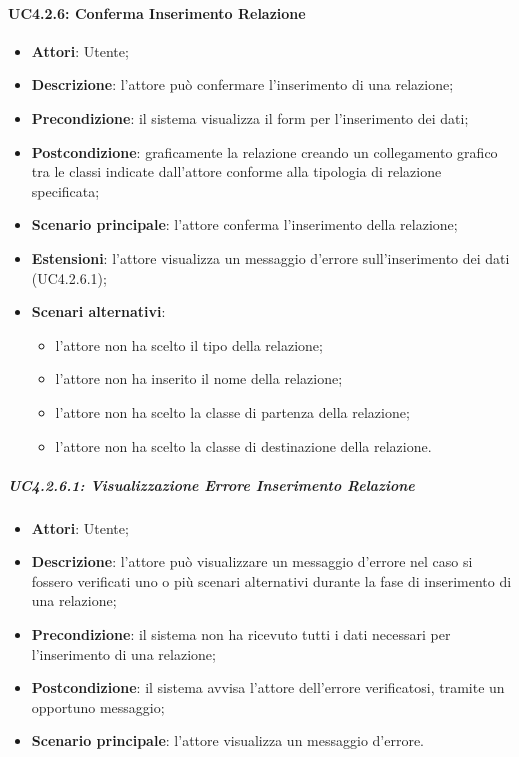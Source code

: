 \begin{itemize}
\begin{itemize}
\begin{itemize}
\begin{itemize}
\paragraph{UC4.2.6: Conferma Inserimento Relazione}
\label{UC4.2.6}
\begin{itemize}
	\item \textbf{Attori}: Utente;
	\item \textbf{Descrizione}: l'attore può confermare l'inserimento di una relazione;
	\item \textbf{Precondizione}: il sistema visualizza il form per l'inserimento dei dati;
	\item \textbf{Postcondizione}: graficamente la relazione creando un collegamento grafico tra le classi indicate dall'attore conforme alla tipologia di relazione specificata;
	\item \textbf{Scenario principale}: l'attore conferma l'inserimento della relazione;
	\item \textbf{Estensioni}: l'attore visualizza un messaggio d'errore sull'inserimento dei dati (UC4.2.6.1);
	\item \textbf{Scenari alternativi}:
	\begin{itemize}
		\item l'attore non ha scelto il tipo della relazione;
		\item l'attore non ha inserito il nome della relazione;
		\item l'attore non ha scelto la classe di partenza della relazione;
		\item l'attore non ha scelto la classe di destinazione della relazione.
	\end{itemize}
\end{itemize}

\subparagraph{UC4.2.6.1: Visualizzazione Errore Inserimento Relazione}
\label{UC4.2.6.1}
\begin{itemize}
	\item \textbf{Attori}: Utente;
	\item \textbf{Descrizione}: l'attore può visualizzare un messaggio d'errore nel caso si fossero verificati uno o più scenari alternativi durante la fase di inserimento di una relazione;
	\item \textbf{Precondizione}: il sistema non ha ricevuto tutti i dati necessari per l'inserimento di una relazione;
	\item \textbf{Postcondizione}: il sistema avvisa l'attore dell'errore verificatosi, tramite un opportuno messaggio;
	\item \textbf{Scenario principale}: l'attore visualizza un messaggio d'errore.
\end{itemize}



\end{itemize}
\end{itemize}
\end{itemize}
\end{itemize}
